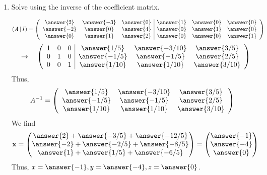 \documentclass{ximera}
\begin{document}
\begin{exercise}
\begin{enumerate}
  \item Solve using the inverse of the coefficient matrix.
    \begin{prompt}
      \[
        (A \, | \, I) = \left(
          \begin{array}{ccc|ccc}
            \answer{2} & \answer{-3} & \answer{0} &  \answer{1} & \answer{0} & \answer{0}  \\
            \answer{-2} & \answer{0} & \answer{4} & \answer{0} & \answer{1} & \answer{0}\\
            \answer{0} & \answer{1} & \answer{2} &\answer{0} & \answer{0} & \answer{1}
          \end{array}
        \right)
      \]
            \[
        \quad \rightarrow \quad
        \left(
          \begin{array}{ccc|ccc}
            1 & 0 & 0 &  \answer{1/5} & \answer{-3/10} & \answer{3/5}  \\
            0 & 1 & 0 & \answer{-1/5} & \answer{-1/5} & \answer{2/5}\\
            0 & 0 &1 &\answer{1/10} & \answer{1/10} & \answer{3/10}
          \end{array}
        \right)
      \]
      Thus,
      \[
        A^{-1} = \left(
          \begin{array}{ccc}
            \answer{1/5} & \answer{-3/10} & \answer{3/5}  \\
            \answer{-1/5} & \answer{-1/5} & \answer{2/5}  \\
            \answer{1/10} & \answer{1/10} & \answer{3/10}
          \end{array}
        \right)
      \]
      We find
      \[
        \textbf{x} = \begin{pmatrix}
          \answer{2}+\answer{-3/5} + \answer{-12/5}\\
          \answer{-2}+\answer{-2/5} + \answer{-8/5}\\
          \answer{1}+\answer{1/5} + \answer{-6/5}
        \end{pmatrix}= \begin{pmatrix}
          \answer{-1}\\
          \answer{-4}\\
          \answer{0}
        \end{pmatrix}
      \]
      Thus, $x= \answer{-1}, y= \answer{-4}, z= \answer{0}$.
    \end{prompt}
  \end{enumerate}
\end{exercise}
\end{document}
